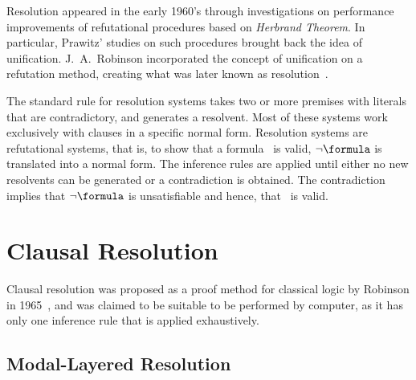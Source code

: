 Resolution appeared in the early 1960's through investigations on performance
improvements of refutational procedures based on \emph{Herbrand Theorem}. In
particular, Prawitz' studies on such procedures brought back the idea of
unification. J.~A.~Robinson incorporated the concept of unification on a
refutation method, creating what was later known as resolution~\cite{casanova}. 

The standard rule for resolution systems takes two or more premises with
literals that are contradictory, and generates a resolvent. Most of these systems
work exclusively with clauses in a specific normal form. Resolution systems are
refutational systems, that is, to show that a formula \formula~is valid, $\neg
\formula$ is translated into a normal form. The inference rules are applied
until either no new resolvents can be generated or a contradiction is obtained.
The contradiction implies that $\neg \formula$ is unsatisfiable and hence, that
\formula~is valid.


\section{Clausal Resolution}

Clausal resolution was proposed as a proof method for classical logic by
Robinson in 1965~\cite{Robinson65}, and was claimed to be suitable to be
performed by computer, as it has only one inference rule that is applied
exhaustively. 

\subsection{Modal-Layered Resolution}



